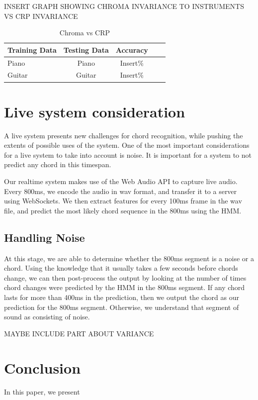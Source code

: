 \documentclass{article}
\begin{document}
INSERT GRAPH SHOWING CHROMA INVARIANCE TO INSTRUMENTS VS CRP INVARIANCE

\begin{table}[t]
\caption{Chroma vs CRP}
\label{chromavscrp}
\vskip 0.15in
\begin{center}
\begin{small}
\begin{sc}
\begin{tabular}{lcccr}
\hline
\abovespace\belowspace
Training Data & Testing Data & Accuracy \\
\hline
\abovespace
Piano  & Piano  & Insert\%\\
Guitar & Guitar  & Insert\%\\
\hline
\end{tabular}
\end{sc}
\end{small}
\end{center}
\vskip -0.1in
\end{table}


\section{Live system consideration}

A live system presents new challenges for chord recognition, while pushing the extents of possible uses of the system.
One of the most important considerations for a live system to take into account is noise. It is important for a system to not predict any chord in this timespan. 

Our realtime system makes use of the Web Audio API to capture live audio. Every 800ms, we encode the audio in wav format, and transfer it to a server using WebSockets. We then extract features for every 100ms frame in the wav file, and predict the most likely chord sequence in the 800ms using the HMM. 

\subsection{Handling Noise}
At this stage, we are able to determine whether the 800ms segment is a noise or a chord. Using the knowledge that it usually takes a few seconds before chords change, we can then post-process the output by looking at the number of times chord changes were predicted by the HMM in the 800ms segment. If any chord lasts for more than 400ms in the prediction, then we output the chord as our prediction for the 800ms segment. Otherwise, we understand that segment of sound as consisting of noise.

MAYBE INCLUDE PART ABOUT VARIANCE

\section{Conclusion}
In this paper, we present



\end{document}
